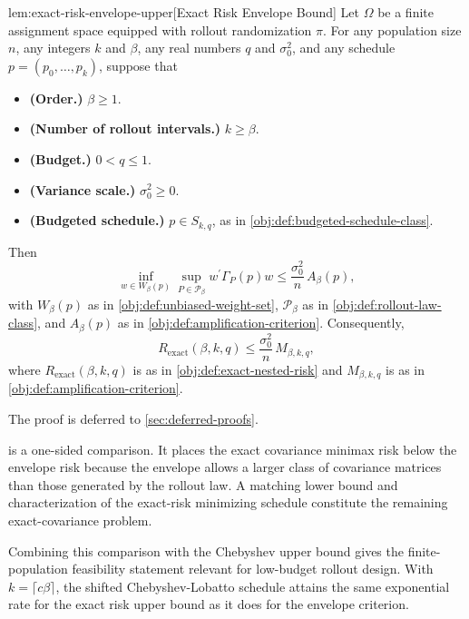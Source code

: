 \documentclass[11pt]{article}
\begin{document}
\begin{lemmav}{lem:exact-risk-envelope-upper}[Exact Risk Envelope Bound]
Let $\Omega$ be a finite assignment space equipped with rollout randomization $\pi$. For any population size $n$, any integers $k$ and $\beta$, any real numbers $q$ and $\sigma_0^2$, and any schedule $p=(p_0,\ldots,p_k)$, suppose that
\begin{itemize}
\item \textbf{(Order.)} $\beta\ge 1$.
\item \textbf{(Number of rollout intervals.)} $k\ge \beta$.
\item \textbf{(Budget.)} $0<q\le 1$.
\item \textbf{(Variance scale.)} $\sigma_0^2\ge 0$.
\item \textbf{(Budgeted schedule.)} $p\in S_{k,q}$, as in \cref{obj:def:budgeted-schedule-class}.
\end{itemize}
Then
\[
\inf_{w\in W_\beta(p)}
\sup_{P\in\mathcal P_\beta}
w^\prime \Gamma_P(p) w
\le
\frac{\sigma_0^2}{n}\,A_\beta(p),
\]
with $W_\beta(p)$ as in \cref{obj:def:unbiased-weight-set}, $\mathcal P_\beta$ as in \cref{obj:def:rollout-law-class}, and $A_\beta(p)$ as in \cref{obj:def:amplification-criterion}. Consequently,
\[
R_{\mathrm{exact}}(\beta,k,q)
\le
\frac{\sigma_0^2}{n}\,M_{\beta,k,q},
\]
where $R_{\mathrm{exact}}(\beta,k,q)$ is as in \cref{obj:def:exact-nested-risk} and $M_{\beta,k,q}$ is as in \cref{obj:def:amplification-criterion}.
\end{lemmav}

The proof is deferred to \cref{sec:deferred-proofs}.

 is a one-sided comparison. It places the exact covariance minimax risk below the envelope risk because the envelope allows a larger class of covariance matrices than those generated by the rollout law. A matching lower bound and characterization of the exact-risk minimizing schedule constitute the remaining exact-covariance problem.

Combining this comparison with the Chebyshev upper bound gives the finite-population feasibility statement relevant for low-budget rollout design. With \(k=\lceil c\beta\rceil\), the shifted Chebyshev-Lobatto schedule attains the same exponential rate for the exact risk upper bound as it does for the envelope criterion.
\end{document}
